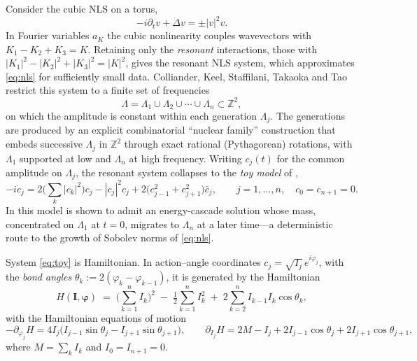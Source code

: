 \documentclass[11pt,a4paper]{article}
\theoremstyle{definition}
\numberwithin{equation}{section}   %
\newcommand{\bI}{\mathbf{I}}
\newcommand{\bphi}{\boldsymbol{\varphi}}
\begin{document}
Consider the cubic NLS on a torus,
\begin{equation}\label{eq:nls}
  -i\partial_t v + \Delta v = \pm |v|^2 v .
\end{equation}
In Fourier variables $a_K$ the cubic nonlinearity couples wavevectors with
$K_1-K_2+K_3=K$. Retaining only the \emph{resonant} interactions, those with
$|K_1|^2-|K_2|^2+|K_3|^2=|K|^2$, gives the resonant NLS system, which
approximates \eqref{eq:nls} for sufficiently small data. Colliander, Keel,
Staffilani, Takaoka and Tao \cite{CKSTT} restrict this system to a finite set of
frequencies
\[
  \Lambda=\Lambda_1\cup\Lambda_2\cup\cdots\cup\Lambda_n\subset\mathbb{Z}^2,
\]
on which the amplitude is constant within each generation $\Lambda_j$. The
generations are produced by an explicit combinatorial ``nuclear family''
construction that embeds successive $\Lambda_j$ in $\mathbb{Z}^2$ through exact
rational (Pythagorean) rotations, with $\Lambda_1$ supported at low and
$\Lambda_n$ at high frequency. Writing $c_j(t)$ for the common amplitude on
$\Lambda_j$, the resonant system collapses to the \emph{toy model} of
\cite{CKSTT},
\begin{equation}\label{eq:toy}
  -i\dot c_j = 2\Big(\sum_k |c_k|^2\Big)c_j - |c_j|^2 c_j
  + 2\big(c_{j-1}^2 + c_{j+1}^2\big)\bar c_j,
  \qquad j=1,\dots,n,\quad c_0=c_{n+1}=0 .
\end{equation}
In \cite{CKSTT} this model is shown to admit an energy-cascade solution whose
mass, concentrated on $\Lambda_1$ at $t=0$, migrates to $\Lambda_n$ at a later
time---a deterministic route to the growth of Sobolev norms of \eqref{eq:nls}.

System \eqref{eq:toy} is Hamiltonian. In action--angle coordinates
$c_j=\sqrt{I_j}\,e^{i\varphi_j}$, with the \emph{bond angles}
$\theta_k:=2(\varphi_k-\varphi_{k-1})$, it is generated by the Hamiltonian
\begin{equation}\label{eq:hamiltonian}
  H(\bI,\bphi) \;=\; \Big(\sum_{k=1}^{n} I_k\Big)^{2}
  \;-\;\tfrac12\sum_{k=1}^{n} I_k^{2}
  \;+\; 2\sum_{k=2}^{n} I_{k-1} I_k \cos\theta_k ,
\end{equation}
with the Hamiltonian equations of motion
\begin{equation}\label{eq:ham-flow}
  -\partial_{\varphi_j}H = 4 I_j\big(I_{j-1}\sin\theta_j - I_{j+1}\sin\theta_{j+1}\big),
  \qquad
  \partial_{I_j}H = 2M - I_j + 2 I_{j-1}\cos\theta_j + 2 I_{j+1}\cos\theta_{j+1},
\end{equation}
where $M=\sum_k I_k$ and $I_0=I_{n+1}=0$.
\end{document}
